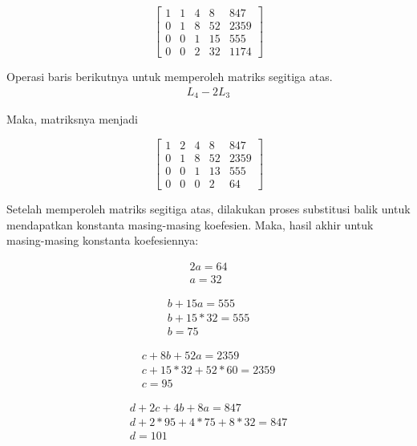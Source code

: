 \begin{center}
	\setlength\arraycolsep{15pt}
	\[
	\begin{bmatrix}
			1 	& 1 	& 4 	& 8 		& 847 	\\[1em]
			0 	& 1 	& 8 	& 52 		& 2359	\\[1em]
			0 	& 0 	& 1 	& 15 		& 555		\\[1em]
			0 	& 0 	& 2 	& 32 		& 1174
	\end{bmatrix}
	\]
\end{center}

Operasi baris berikutnya untuk memperoleh matriks segitiga atas.
\begin{align*}
	L_4 - 2L_3
\end{align*}

Maka, matriksnya menjadi

\begin{center}
	\setlength\arraycolsep{15pt}
	\[
	\begin{bmatrix}
			1 	& 2 	& 4 	& 8 		& 847 	\\[1em]
			0 	& 1 	& 8 	& 52 		& 2359	\\[1em]
			0 	& 0 	& 1 	& 13 		& 555		\\[1em]
			0 	& 0 	& 0 	& 2 		& 64
	\end{bmatrix}
	\]
\end{center}

Setelah memperoleh matriks segitiga atas, dilakukan proses substitusi balik untuk mendapatkan konstanta masing-masing koefesien. Maka, hasil akhir untuk masing-masing konstanta koefesiennya:

\begin{gather*}
	2a = 64 \\
	a = 32
\end{gather*}

\begin{gather*}
	b + 15a = 555 \\
	b + 15*32 = 555 \\
	b = 75
\end{gather*}

\begin{gather*}
	c + 8b + 52a = 2359 \\
	c + 15*32 + 52*60 = 2359 \\
	c = 95
\end{gather*}

\begin{gather*}
	d + 2c + 4b + 8a = 847 \\
	d + 2*95 + 4*75 + 8*32 = 847 \\
	d = 101
\end{gather*}

